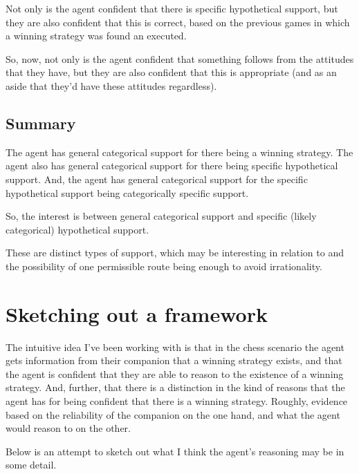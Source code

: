 \documentclass[10pt]{article}
\begin{document}
Not only is the agent confident that there is specific hypothetical support, but they are also confident that this is correct, based on the previous games in which a winning strategy was found an executed.

So, now, not only is the agent confident that something follows from the attitudes that they have, but they are also confident that this is appropriate (and as an aside that they'd have these attitudes regardless).

\subsection{Summary}
\label{sec:summary}




The agent has general categorical support for there being a winning strategy.
The agent also has general categorical support for there being specific hypothetical support.
And, the agent has general categorical support for the specific hypothetical support being categorically specific support.

So, the interest is between general categorical support and specific (likely categorical) hypothetical support.

These are distinct types of support, which may be interesting in relation to \citeauthor{Lord:2018aa} and the possibility of one permissible route being enough to avoid irrationality.



\section{Sketching out a framework}
\label{sec:sketch-out-fram}

\begin{note}
  The intuitive idea I've been working with is that in the chess scenario the agent gets information from their companion that a winning strategy exists, and that the agent is confident that they are able to reason to the existence of a winning strategy.
  And, further, that there is a distinction in the kind of reasons that the agent has for being confident that there is a winning strategy.
  Roughly, evidence based on the reliability of the companion on the one hand, and what the agent would reason to on the other.

  Below is an attempt to sketch out what I think the agent's reasoning may be in some detail.
\end{note}
\end{document}
